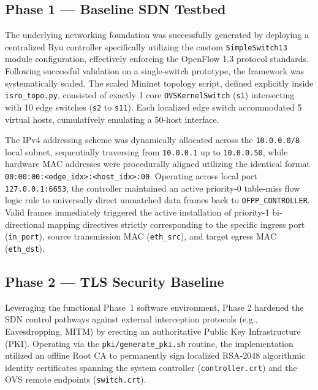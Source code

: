 \documentclass[12pt]{article}
\begin{document}
\subsection{Phase 1 — Baseline SDN Testbed}

The underlying networking foundation was successfully generated by deploying a centralized Ryu controller specifically utilizing the custom \texttt{SimpleSwitch13} module configuration, effectively enforcing the OpenFlow 1.3 protocol standards. Following successful validation on a single-switch prototype, the framework was systematically scaled. The scaled Mininet topology script, defined explicitly inside \texttt{isro\_topo.py}, consisted of exactly 1 core \texttt{OVSKernelSwitch} (\texttt{s1}) intersecting with 10 edge switches (\texttt{s2} to \texttt{s11}). Each localized edge switch accommodated 5 virtual hosts, cumulatively emulating a 50-host interface.

The IPv4 addressing scheme was dynamically allocated across the \texttt{10.0.0.0/8} local subnet, sequentially traversing from \texttt{10.0.0.1} up to \texttt{10.0.0.50}, while hardware MAC addresses were procedurally aligned utilizing the identical format \texttt{00:00:00:<edge\_idx>:<host\_idx>:00}. Operating across local port \texttt{127.0.0.1:6653}, the controller maintained an active priority-0 table-miss flow logic rule to universally direct unmatched data frames back to \texttt{OFPP\_CONTROLLER}. Valid frames immediately triggered the active installation of priority-1 bi-directional mapping directives strictly corresponding to the specific ingress port (\texttt{in\_port}), source transmission MAC (\texttt{eth\_src}), and target egress MAC (\texttt{eth\_dst}).

\subsection{Phase 2 — TLS Security Baseline}

Leveraging the functional Phase~1 software environment, Phase 2 hardened the SDN control pathways against external interception protocols (e.g., Eavesdropping, MITM) by erecting an authoritative Public Key Infrastructure (PKI). Operating via the \texttt{pki/generate\_pki.sh} routine, the implementation utilized an offline Root CA to permanently sign localized RSA-2048 algorithmic identity certificates spanning the system controller (\texttt{controller.crt}) and the OVS remote endpoints (\texttt{switch.crt}).
\end{document}
